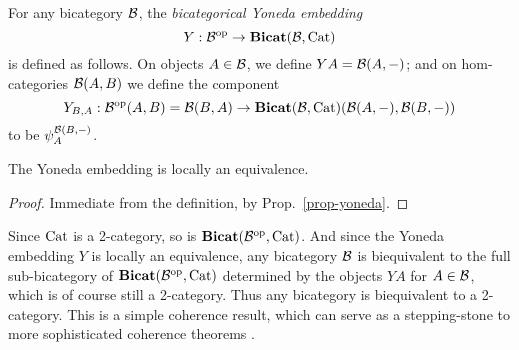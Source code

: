 \begin{definition}
	For any bicategory $\mathcal{B}$, the \emph{bicategorical Yoneda embedding}
	\[
		Y: \mathcal{B}^\mathrm{op}\to\mathbf{Bicat}(\mathcal{B},\mathrm{Cat})
	\]
	is defined as follows.
	On objects $A\in\mathcal{B}$, we define $YA = \mathcal{B}(A,-)$; and
	on hom-categories $\mathcal{B}(A,B)$ we define the component
	\[
		Y_{B,A} : \mathcal{B}^\mathrm{op}(A,B) = \mathcal{B}(B,A) \to \mathbf{Bicat}(\mathcal{B},\mathrm{Cat})(\mathcal{B}(A,-), \mathcal{B}(B,-))
	\]
	to be $\psi^{\mathcal{B}(B,-)}_A$.
\end{definition}
\begin{corollary}
	The Yoneda embedding is locally an equivalence.
\end{corollary}
\begin{proof}
	Immediate from the definition, by Prop.~\ref{prop-yoneda}.
\end{proof}
\begin{remark}
	Since $\mathrm{Cat}$ is a 2-category, so is $\mathbf{Bicat}(\mathcal{B}^\mathrm{op},\mathrm{Cat})$.
	And since the Yoneda embedding $Y$ is locally an equivalence, any
	bicategory $\mathcal{B}$ is biequivalent to the full sub-bicategory of
	$\mathbf{Bicat}(\mathcal{B}^\mathrm{op},\mathrm{Cat})$ determined by the objects $YA$ for $A\in\mathcal{B}$, which
	is of course still a 2-category. Thus any bicategory is biequivalent
	to a 2-category. This is a simple coherence result, which can serve
	as a stepping-stone to more sophisticated coherence theorems
	\citep[Chapter~2]{GurskiThesis}.
\end{remark}

